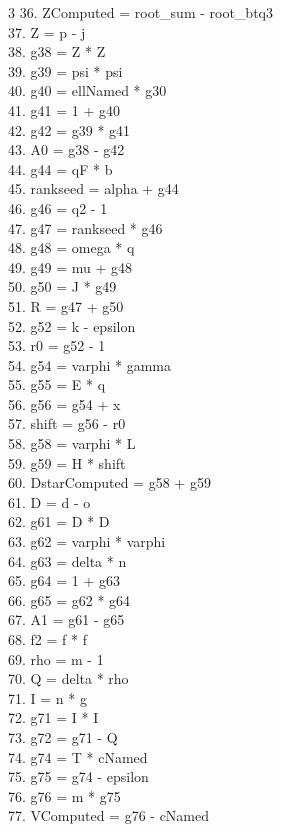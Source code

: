 \documentclass[10pt]{article}
\begin{document}
\begin{multicols}{3}
36. ZComputed = root\_sum - root\_btq3\\
37. Z = p - j\\
38. g38 = Z * Z\\
39. g39 = psi * psi\\
40. g40 = ellNamed * g30\\
41. g41 = 1 + g40\\
42. g42 = g39 * g41\\
43. A0 = g38 - g42\\
44. g44 = qF * b\\
45. rankseed = alpha + g44\\
46. g46 = q2 - 1\\
47. g47 = rankseed * g46\\
48. g48 = omega * q\\
49. g49 = mu + g48\\
50. g50 = J * g49\\
51. R = g47 + g50\\
52. g52 = k - epsilon\\
53. r0 = g52 - 1\\
54. g54 = varphi * gamma\\
55. g55 = E * q\\
56. g56 = g54 + x\\
57. shift = g56 - r0\\
58. g58 = varphi * L\\
59. g59 = H * shift\\
60. DstarComputed = g58 + g59\\
61. D = d - o\\
62. g61 = D * D\\
63. g62 = varphi * varphi\\
64. g63 = delta * n\\
65. g64 = 1 + g63\\
66. g65 = g62 * g64\\
67. A1 = g61 - g65\\
68. f2 = f * f\\
69. rho = m - 1\\
70. Q = delta * rho\\
71. I = n * g\\
72. g71 = I * I\\
73. g72 = g71 - Q\\
74. g74 = T * cNamed\\
75. g75 = g74 - epsilon\\
76. g76 = m * g75\\
77. VComputed = g76 - cNamed\\

\end{multicols}
\end{document}
